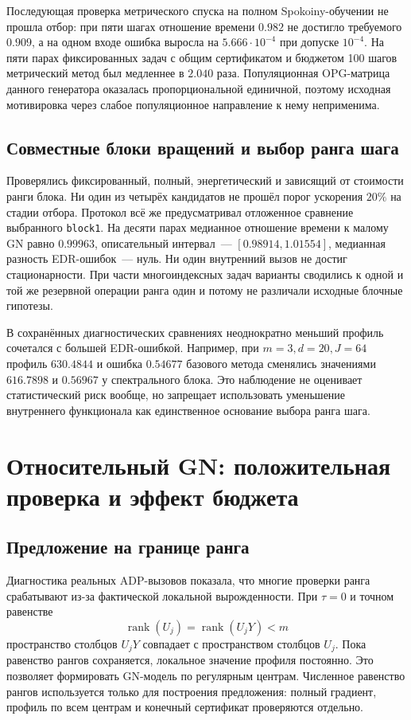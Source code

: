 \documentclass[11pt,a4paper]{article}
\numberwithin{equation}{section}
\newcommand{\file}[1]{\nolinkurl{#1}}
\DeclareMathOperator{\rank}{rank}
\begin{document}
Последующая проверка метрического спуска на полном Spokoiny-обучении
не прошла отбор: при пяти шагах отношение времени $0.982$
не достигло требуемого $0.909$, а на одном входе ошибка выросла
на $5.666\cdot10^{-4}$ при допуске $10^{-4}$.
На пяти парах фиксированных задач с общим сертификатом
и бюджетом 100 шагов метрический метод был медленнее в $2.040$ раза.
Популяционная OPG-матрица данного генератора оказалась пропорциональной
единичной, поэтому исходная мотивировка через слабое популяционное
направление к нему неприменима.\cite{metric}

\subsection{Совместные блоки вращений и выбор ранга шага}

Проверялись фиксированный, полный, энергетический и зависящий
от стоимости ранги блока. Ни один из четырёх кандидатов не прошёл
порог ускорения $20\%$ на стадии отбора.
Протокол всё же предусматривал отложенное сравнение выбранного
\file{block1}. На десяти парах медианное отношение времени
к малому GN равно $0.99963$, описательный интервал~---
$[0.98914,1.01554]$, медианная разность EDR-ошибок~--- нуль.
Ни один внутренний вызов не достиг стационарности.
При части многоиндексных задач варианты сводились к одной и той же
резервной операции ранга один и потому не различали исходные блочные
гипотезы.

В сохранённых диагностических сравнениях неоднократно меньший профиль
сочетался с большей EDR-ошибкой. Например, при $m=3,d=20,J=64$
профиль $630.4844$ и ошибка $0.54677$ базового метода сменялись
значениями $616.7898$ и $0.56967$ у спектрального блока.
Это наблюдение не оценивает статистический риск вообще, но запрещает
использовать уменьшение внутреннего функционала как единственное
основание выбора ранга шага.\cite{rankk}

\section{Относительный GN: положительная проверка и эффект бюджета}
\label{sec:relative}

\subsection{Предложение на границе ранга}

Диагностика реальных ADP-вызовов показала, что многие проверки ранга
срабатывают из-за фактической локальной вырожденности. При $\tau=0$
и точном равенстве
\[
 \rank(U_j)=\rank(U_jY)<m
\]
пространство столбцов $U_jY$ совпадает с пространством столбцов $U_j$.
Пока равенство рангов сохраняется, локальное значение профиля постоянно.
Это позволяет формировать GN-модель по регулярным центрам.
Численное равенство рангов используется только для построения предложения:
полный градиент, профиль по всем центрам и конечный сертификат
проверяются отдельно.
\end{document}
